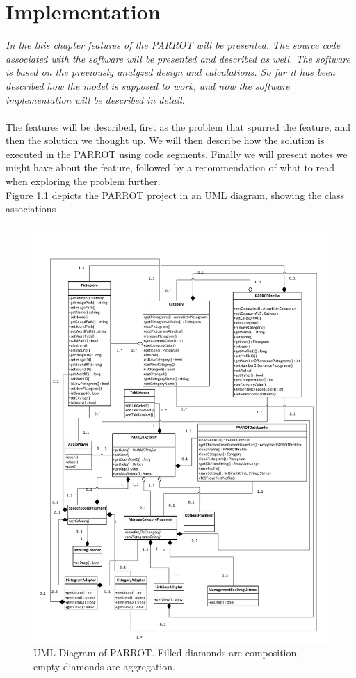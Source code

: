 \chapter{Implementation}
\label{imp}
\textit{In the this chapter features of the PARROT will be presented. The source code associated with the software will be presented and described as well. The software is based on the previously analyzed design and calculations. So far it has been described how the model is supposed to work, and now the software implementation will be described in detail.}\\
\\
The features will be described, first as the problem that spurred the feature, and then the solution we thought up. 
We will then describe how the solution is executed in the PARROT using code segments. Finally we will present notes we might have about the feature, followed by a recommendation of what to read when exploring the problem further.\\

Figure \ref{fig:ClassUMLPARROTPDF} depicts the PARROT project in an UML diagram, showing the class associations .

\begin{figure}
	\centering
		\includegraphics[width=1.0\textwidth]{input/images/ClassUMLPARROTPDF.pdf}
	\caption{UML Diagram of PARROT. Filled diamonds are composition, empty diamonds are aggregation.}
	\label{fig:ClassUMLPARROTPDF}
\end{figure}


